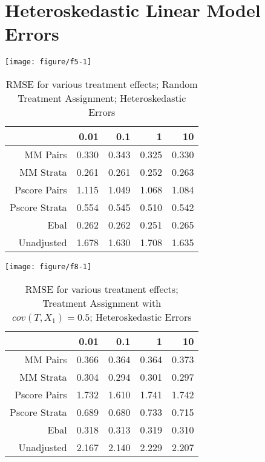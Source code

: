 \documentclass[11pt]{article}\usepackage[]{graphicx}\usepackage[]{color}
\makeatletter
\def\maxwidth{ %
  \ifdim\Gin@nat@width>\linewidth
    \linewidth
  \else
    \Gin@nat@width
  \fi
}
\newenvironment{knitrout}{}{} %
\makeatother
\begin{document}
\section{Heteroskedastic Linear Model Errors}
\begin{knitrout}
\color{fgcolor}

{\centering \texttt{[image: figure/f5-1]} 

}



\end{knitrout}
\begin{table}[ht]
\centering
\begin{tabular}{rrrrr}
  \hline
 & 0.01 & 0.1 & 1 & 10 \\ 
  \hline
MM Pairs & 0.330 & 0.343 & 0.325 & 0.330 \\ 
  MM Strata & 0.261 & 0.261 & 0.252 & 0.263 \\ 
  Pscore Pairs & 1.115 & 1.049 & 1.068 & 1.084 \\ 
  Pscore Strata & 0.554 & 0.545 & 0.510 & 0.542 \\ 
  Ebal & 0.262 & 0.262 & 0.251 & 0.265 \\ 
  Unadjusted & 1.678 & 1.630 & 1.708 & 1.635 \\ 
   \hline
\end{tabular}
\caption{RMSE for various treatment effects; Random Treatment Assignment; Heteroskedastic Errors} 
\label{tab:f5}
\end{table}


\begin{knitrout}
\color{fgcolor}

{\centering \texttt{[image: figure/f8-1]} 

}



\end{knitrout}
\begin{table}[ht]
\centering
\begin{tabular}{rrrrr}
  \hline
 & 0.01 & 0.1 & 1 & 10 \\ 
  \hline
MM Pairs & 0.366 & 0.364 & 0.364 & 0.373 \\ 
  MM Strata & 0.304 & 0.294 & 0.301 & 0.297 \\ 
  Pscore Pairs & 1.732 & 1.610 & 1.741 & 1.742 \\ 
  Pscore Strata & 0.689 & 0.680 & 0.733 & 0.715 \\ 
  Ebal & 0.318 & 0.313 & 0.319 & 0.310 \\ 
  Unadjusted & 2.167 & 2.140 & 2.229 & 2.207 \\ 
   \hline
\end{tabular}
\caption{RMSE for various treatment effects; Treatment Assignment with $cov(T, X_1) = 0.5$; Heteroskedastic Errors} 
\label{tab:f8}
\end{table}
\end{document}
